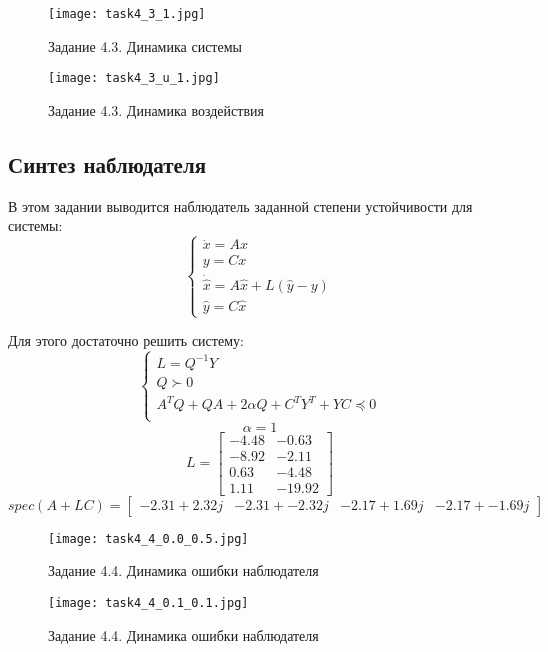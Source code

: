 \begin{figure}[]
    \centering
    \texttt{[image: task4\_3\_1.jpg]}
    \caption{Задание 4.3. Динамика системы}
    \label{fig:task4_3_1}
\end{figure}
\begin{figure}[]
    \centering
    \texttt{[image: task4\_3\_u\_1.jpg]}
    \caption{Задание 4.3. Динамика воздействия}
    \label{fig:task4_3_u_1}
\end{figure}


\subsection{Синтез наблюдателя}

В этом задании выводится наблюдатель заданной степени устойчивости для системы:
\[
        \begin{cases}
                \dot{x} = A x \\
                y = C x \\
                \dot{\hat{x}} = A \hat{x} + L(\hat{y} - y) \\
                \hat{y} = C \hat{x}
        \end{cases} 
\]

Для этого достаточно решить систему:
\[
        \begin{cases}
                L = Q^{-1}Y\\
                Q \succ 0 \\
                A^TQ + QA + 2 \alpha Q + C^T Y^T + YC \preccurlyeq 0  \\
        \end{cases} 
\]
\[ \alpha = 1\]
\[L = \begin{bmatrix}
 -4.48 & -0.63\\
 -8.92 & -2.11\\
  0.63 & -4.48\\
  1.11 & -19.92
\end{bmatrix}\]
\[spec(A + LC) = \begin{bmatrix}
 -2.31 + 2.32j & -2.31 + -2.32j & -2.17 + 1.69j & -2.17 + -1.69j
\end{bmatrix}\]
\begin{figure}[]
    \centering
    \texttt{[image: task4\_4\_0.0\_0.5.jpg]}
    \caption{Задание 4.4. Динамика ошибки наблюдателя}
    \label{fig:task4_4_1}
\end{figure}

\begin{figure}[]
    \centering
    \texttt{[image: task4\_4\_0.1\_0.1.jpg]}
    \caption{Задание 4.4. Динамика ошибки наблюдателя}
    \label{fig:task4_4_2}
\end{figure}

